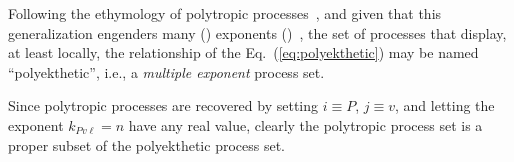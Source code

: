     Following the  ethymology  of  polytropic  processes~\cite{2020-NaaktgeborenC-engrXiv},  and
    given    that    this    generalization    engenders    many    ()    exponents
    ()~\cite{1997-ManiatoglouMPF-Porto}, the set of processes that  display,  at
    least  locally,  the  relationship  of  the   Eq.~(\ref{eq:polyekthetic})   may   be   named
    ``polyekthetic'', i.e., a \emph{multiple exponent} process set.

    Since polytropic processes are recovered by setting $i \equiv P$, $j \equiv v$, and  letting
    the exponent $k_{Pv\ell} = n$ have any real value, clearly the polytropic process set  is  a
    proper subset of the polyekthetic process set.


